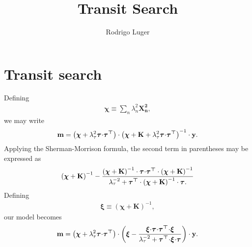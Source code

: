 \documentclass[]{emulateapj}
\begin{document}
\title{Transit Search}
\author{Rodrigo Luger}


\section{Transit search}
\label{sec:transit_search}
Defining
%
\begin{align}
\boldsymbol{\chi} \equiv \sum_n \lambda_n^2 \mathbf{X^2_n},
\end{align}
%
we may write
%
\begin{align}
\mathbf{m} = \left(\boldsymbol{\chi} + \lambda_\tau^2 \boldsymbol{\tau} \hspace{-2pt} \cdot \hspace{-2pt} \boldsymbol{\tau^\top} \right)
            \cdot
            \left(
            \boldsymbol{\chi} + \mathbf{K} + \lambda_\tau^2 \boldsymbol{\tau} \hspace{-2pt} \cdot \hspace{-2pt} \boldsymbol{\tau^\top}
            \right)^{-1} 
            \cdot
            \mathbf{y}.
\end{align}
Applying the Sherman-Morrison formula, the second term in parentheses may be expressed as
%
\begin{align}
\left( \boldsymbol{\chi} + \mathbf{K} \right)^{-1} 
-
\frac{
       \left( \boldsymbol{\chi} + \mathbf{K} \right)^{-1} 
       \cdot
       \boldsymbol{\tau} \hspace{-2pt} \cdot \hspace{-2pt} \boldsymbol{\tau^\top}
       \cdot
       \left( \boldsymbol{\chi} + \mathbf{K} \right)^{-1} 
}
{
       \lambda_\tau^{-2} + \boldsymbol{\tau^\top}
       \cdot
       \left( \boldsymbol{\chi} + \mathbf{K} \right)^{-1} 
       \cdot
       \boldsymbol{\tau}.
}
\end{align}
Defining
%
\begin{align}
\boldsymbol{\xi} \equiv \left( \boldsymbol{\chi} + \mathbf{K} \right)^{-1},
\end{align}
%
our model becomes
%
\begin{align}
\mathbf{m} = \left(\boldsymbol{\chi} + \lambda_\tau^2 \boldsymbol{\tau} \hspace{-2pt} \cdot \hspace{-2pt} \boldsymbol{\tau^\top} \right)
            \cdot
            \left(
            \boldsymbol{\xi} - \frac{\boldsymbol{\xi} \hspace{-2pt} \cdot \hspace{-2pt} \boldsymbol{\tau} \hspace{-2pt} \cdot \hspace{-2pt} \boldsymbol{\tau^\top} \hspace{-2pt} \cdot \hspace{-2pt} \boldsymbol{\xi}}
                             {\lambda_\tau^{-2} + \boldsymbol{\tau^\top} \hspace{-2pt} \cdot \hspace{-2pt} \boldsymbol{\xi} \hspace{-2pt} \cdot \hspace{-2pt} \boldsymbol{\tau}}
            \right)
            \cdot
            \mathbf{y}.
\end{align}
\end{document}
